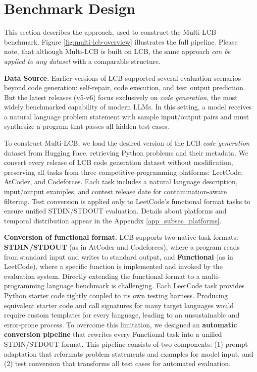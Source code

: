 \documentclass{article} %
\begin{document}


\section{Benchmark Design}
\label{sec_bench}
This section describes the approach, used to construct the Multi-LCB benchmark. Figure \ref{fig:multi-lcb-overview} illustrates the full pipeline. %
Please note, that although Multi-LCB is built on LCB, the same approach \textit{can be applied to any dataset} with a comparable structure.



\textbf{Data Source.} Earlier versions of LCB supported several evaluation scenarios beyond code generation: self-repair, code execution, and test output prediction. But the latest releases (v5-v6) focus exclusively on \textit{code generation}, the most widely benchmarked capability of modern LLMs. In this setting, a model receives a natural language problem statement with sample input/output pairs and must synthesize a program that passes all hidden test cases.

To construct Multi-LCB, we load the desired version of the LCB \textit{code generation} dataset from Hugging Face, retrieving Python problems and their metadata. We convert every release of LCB code generation dataset without modification, preserving all tasks from three competitive-programming platforms: LeetCode, AtCoder, and Codeforces. Each task includes a natural language description, input/output examples, and contest release date for contamination-aware filtering. Test conversion is applied only to LeetCode's functional format tasks to ensure unified STDIN/STDOUT evaluation. Details about platforms and temporal distribution appear in the Appendix \ref{app_subsec_platforms}.


\textbf{Conversion of functional format.} LCB supports two native task formats: \textbf{STDIN/STDOUT} (as in AtCoder and Codeforces), where a program reads from standard input and writes to standard output, and \textbf{Functional} (as in LeetCode), where a specific function is implemented and invoked by the evaluation system.
Directly extending the functional format to a multi-programming language benchmark is challenging.
Each LeetCode task provides Python starter code tightly coupled to its own testing harness. Producing equivalent starter code and call signatures for many target languages would require custom templates for every language, leading to an unsustainable and error-prone process.
To overcome this limitation, we designed an \textbf{automatic conversion pipeline} that rewrites every Functional task into a unified STDIN/STDOUT format. This pipeline consists of two components: (1) prompt adaptation that reformats problem statements and examples for model input, and (2) test conversion that transforms all test cases for automated evaluation.
\end{document}
